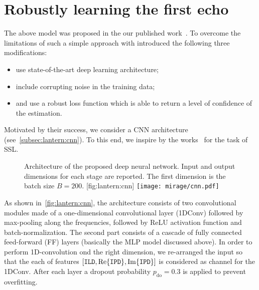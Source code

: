 \section{Robustly learning the first echo}\label{sec:lantern:robust}
The above model was proposed in the our published work~.
To overcome the limitations of such a simple approach with introduced the following three modifications:
\begin{itemize}
    \item use state-of-the-art deep learning architecture;
    \item include corrupting noise in the training data;
    \item and use a robust loss function which is able to return a level of confidence of the estimation.
\end{itemize}
Motivated by their success, we consider a \ac{CNN} architecture (see~\cref{subsec:lantern:cnn}).
To this end, we inspire by the works~ for the task of \ac{SSL}.
\begin{figure}[h]
    \begin{sidecaption}[CNN]{
        Architecture of the proposed deep neural network. Input and output dimensions for each stage are reported. The first dimension is the batch size $B = 200$.
        }[fig:lantern:cnn]
        \centering
        \texttt{[image: mirage/cnn.pdf]}
    \end{sidecaption}
\end{figure}
As shown in~\cref{fig:lantern:cnn}, the architecture consists of two convolutional modules made of a one-dimensional convolutional layer (1DConv) followed by max-pooling along the frequencies, followed by \ac{ReLU} activation function and batch-normalization.
The second part consists of a cascade of fully connected feed-forward (FF) layers (basically the \ac{MLP} model discussed above).
In order to perform 1D-convolution ond the right dimension, we re-arranged the input so that the each of features $\klist{ \ild, \kRe\set{\ipd}, \kIm\set{\ipd}}$ is considered as channel for the 1DConv.
After each layer a dropout probability $p_\text{do} = 0.3$ is applied to prevent overfitting.

\mynewline
